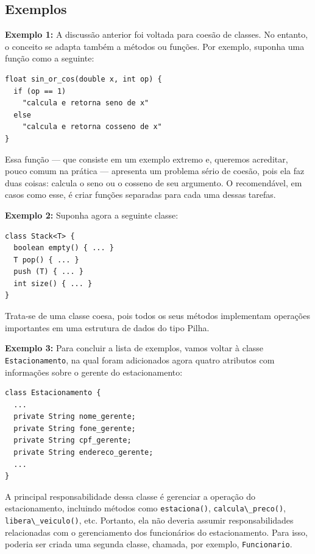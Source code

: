 \documentclass[
  11pt,
  twoside]{book}
\newcommand{\passthrough}[1]{#1}
\begin{document}
\hypertarget{exemplos}{%
\subsection{Exemplos}\label{exemplos}}

\textbf{Exemplo 1:} A discussão anterior foi voltada para coesão de
classes. No entanto, o conceito se adapta também a métodos ou funções.
Por exemplo, suponha uma função como a seguinte:

\begin{lstlisting}
float sin_or_cos(double x, int op) {
  if (op == 1)
    "calcula e retorna seno de x"
  else
    "calcula e retorna cosseno de x"
}
\end{lstlisting}

Essa função --- que consiste em um exemplo extremo e, queremos
acreditar, pouco comum na prática --- apresenta um problema sério de
coesão, pois ela faz duas coisas: calcula o seno ou o cosseno de seu
argumento. O recomendável, em casos como esse, é criar funções separadas
para cada uma dessas tarefas.

\textbf{Exemplo 2:} Suponha agora a seguinte classe:

\begin{lstlisting}
class Stack<T> {
  boolean empty() { ... }
  T pop() { ... }
  push (T) { ... }
  int size() { ... }
}
\end{lstlisting}

Trata-se de uma classe coesa, pois todos os seus métodos implementam
operações importantes em uma estrutura de dados do tipo Pilha.

\textbf{Exemplo 3:} Para concluir a lista de exemplos, vamos voltar à
classe \passthrough{\lstinline!Estacionamento!}, na qual foram
adicionados agora quatro atributos com informações sobre o gerente do
estacionamento:

\begin{lstlisting}
class Estacionamento {
  ...
  private String nome_gerente;
  private String fone_gerente;
  private String cpf_gerente;
  private String endereco_gerente;
  ...
}  
\end{lstlisting}

A principal responsabilidade dessa classe é gerenciar a operação do
estacionamento, incluindo métodos como
\passthrough{\lstinline!estaciona()!},
\passthrough{\lstinline!calcula\_preco()!},
\passthrough{\lstinline!libera\_veiculo()!}, etc. Portanto, ela não
deveria assumir responsabilidades relacionadas com o gerenciamento dos
funcionários do estacionamento. Para isso, poderia ser criada uma
segunda classe, chamada, por exemplo,
\passthrough{\lstinline!Funcionario!}.
\end{document}
